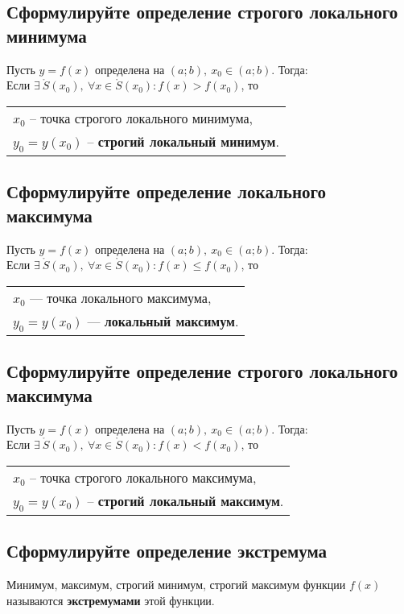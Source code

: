 \subsection{Сформулируйте определение строгого локального минимума}
\begin{definition}
	Пусть $y=f(x)$ определена на $(a;b),\ x_0 \in (a;b)$. Тогда:\\[1ex]
	Если $\exists\ \mathring{S}(x_0),\ \forall x \in \mathring{S}(x_0)\colon f(x) > f(x_0)$, то \begin{tabular}{l} $x_0$ -- \small{точка строгого локального минимума}, \\ $y_0 = y(x_0)$ -- \small{\textbf{строгий локальный минимум}}. \end{tabular}
\end{definition}

\subsection{Сформулируйте определение локального максимума}
\begin{definition}
	Пусть $y=f(x)$ определена на $(a;b),\ x_0 \in (a;b)$. Тогда:\\[1ex]
	Если $\exists\ \mathring{S}(x_0),\ \forall x \in \mathring{S}(x_0)\colon f(x) \le f(x_0)$, то \begin{tabular}{l} $x_0$ --- точка локального максимума, \\ $y_0 = y(x_0)$ --- \textbf{локальный максимум}. \end{tabular}
\end{definition}

\subsection{Сформулируйте определение строгого локального максимума}
\begin{definition}
	Пусть $y=f(x)$ определена на $(a;b),\ x_0 \in (a;b)$. Тогда:\\[1ex]
	Если $\exists\ \mathring{S}(x_0),\ \forall x \in \mathring{S}(x_0)\colon f(x) < f(x_0)$, то\hspace{-2pt} \begin{tabular}{l} $x_0$ -- \small{точка строгого локального максимума}, \\ $y_0 = y(x_0)$ -- \small{\textbf{строгий локальный максимум}}. \end{tabular}
\end{definition}

\subsection{Сформулируйте определение экстремума}
\begin{definition}
    Минимум, максимум, строгий минимум, строгий максимум функции $f(x)$ называются \textbf{экстремумами} этой функции.
\end{definition}

